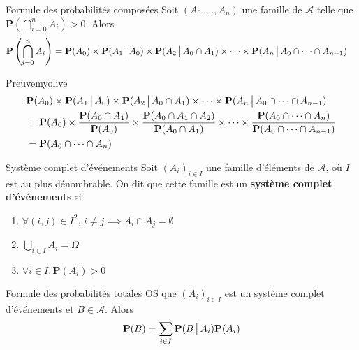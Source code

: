     \begin{prop}{Formule des probabilités composées}{}
        Soit $(A_0, \ldots, A_n)$ une famille de $\mathcal{A}$ telle que $\mathbf{P}\left(\bigcap_{i =0}^n A_i\right) > 0$. Alors 
        \begin{align*}
            \mathbf{P}\left(\bigcap_{i =0}^n A_i\right)
            &= \mathbf{P}(A_0) \times \mathbf{P}(A_1 \, \big| \, A_0) \times \mathbf{P}(A_2 \, \big| \, A_0 \cap A_1) \times \cdots \times \mathbf{P}(A_n \, \big| \, A_0 \cap \cdots \cap A_{n - 1})
        \end{align*}
    \end{prop}

    \begin{demo}{Preuve}{myolive}
        \begin{align*}
            &\mathbf{P}(A_0) \times \mathbf{P}(A_1 \, \big| \, A_0) \times \mathbf{P}(A_2 \, \big| \, A_0 \cap A_1) \times \cdots \times \mathbf{P}(A_n \, \big| \, A_0 \cap \cdots \cap A_{n - 1}) \\
            &= \mathbf{P}(A_0) \times \frac{\mathbf{P}(A_0 \cap A_1)}{\mathbf{P}(A_0)} \times \frac{\mathbf{P}(A_0 \cap A_1 \cap A_2)}{\mathbf{P}(A_0 \cap A_1)} \times \cdots \times \frac{\mathbf{P}(A_0 \cap \cdots \cap A_n)}{\mathbf{P}(A_0 \cap \cdots \cap A_{n-1})} \\
            &= \mathbf{P}(A_0 \cap \cdots \cap A_n)
        \end{align*}
    \end{demo}

    \begin{defi}{Système complet d’événements}{}
        Soit $(A_i)_{i \in I}$ une famille d’éléments de $\mathcal{A}$, où $I$ est au plus dénombrable. On dit que cette famille est un \textbf{système complet d’événements} si 
        \begin{enumerate}
            \item $\forall (i,j) \in I^2$, $i \neq j \implies A_i \cap A_j = \emptyset$
            \item $\bigcup_{i \in I} A_i = \Omega$
            \item $\forall i \in I, \mathbf{P}(A_i) > 0$
        \end{enumerate}
    \end{defi}

    \begin{prop}{Formule des probabilités totales}{}
        OS que $(A_i)_{i \in I}$ est un système complet d’événements et $B \in \mathcal{A}$. Alors 
        \[ \mathbf{P}(B) = \sum_{i \in I} \mathbf{P}(B \, \big| \, A_i) \mathbf{P}(A_i) \]    
    \end{prop}

